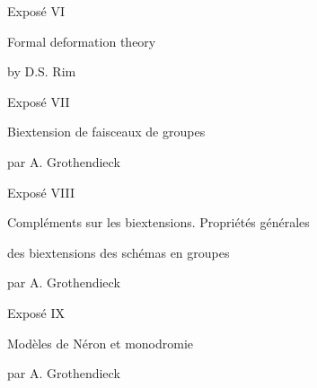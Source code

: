 \medskip
\noindent
Exposé VI\par
\hspace*{2em}Formal deformation theory\par
\hspace*{2em}by D.S. Rim \par

\medskip
\noindent
Exposé VII\par
\hspace*{2em}Biextension de faisceaux de groupes\par
\hspace*{2em}par A. Grothendieck \par

\medskip
\noindent
Exposé VIII\par
\hspace*{2em}Compléments sur les biextensions. Propriétés générales\par
\hspace*{2em}des biextensions des schémas en groupes\par
\hspace*{2em}par A. Grothendieck \par

\medskip
\noindent
Exposé IX\par
\hspace*{2em}Modèles de Néron et monodromie\par
\hspace*{2em}par A. Grothendieck \par
\clearpage

\null
\clearpage
